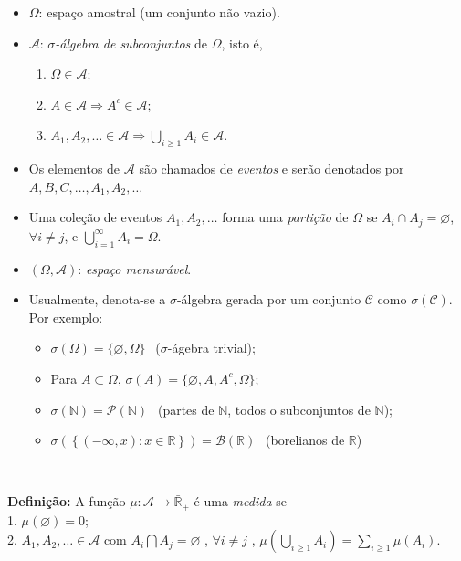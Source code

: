 \documentclass[
]{book}
\providecommand{\tightlist}{%
  \setlength{\itemsep}{0pt}\setlength{\parskip}{0pt}}
\begin{document}
\begin{itemize}
\item
  \(\Omega\): espaço amostral (um conjunto não vazio).
\item
  \(\mathcal{A}\): \emph{\(\sigma\)-álgebra de subconjuntos} de \(\Omega\), isto é,

  \begin{enumerate}
  \def\labelenumi{\arabic{enumi}.}
  \tightlist
  \item
    \(\Omega \in \mathcal{A}\);
  \item
    \(A \in \mathcal{A} \Longrightarrow A^{c} \in \mathcal{A}\);
  \item
    \(\displaystyle A_1, A_2, \ldots \in \mathcal{A} \Longrightarrow \bigcup_{i\geq1} A_i \in \mathcal{A}\).
  \end{enumerate}
\item
  Os elementos de \(\mathcal{A}\) são chamados de \emph{eventos} e serão denotados por \(A, B, C, \ldots, A_1, A_2, \ldots\)
\item
  Uma coleção de eventos \(A_1,A_2,\ldots\) forma uma \emph{partição} de \(\Omega\) se \(A_i \cap A_j = \varnothing\), \(\forall i \neq j\), e \(\displaystyle \bigcup_{i=1}^{\infty} A_i = \Omega\).
\item
  \((\Omega, \mathcal{A})\): \emph{espaço mensurável}.
\item
  Usualmente, denota-se a \(\sigma\)-álgebra gerada por um conjunto \(\mathcal{C}\) como \(\sigma(\mathcal{C})\). Por exemplo:

  \begin{itemize}
  \tightlist
  \item
    \(\sigma(\Omega) = \{\varnothing,\Omega\}~~\) (\(\sigma\)-ágebra trivial);
  \item
    Para \(A \subset \Omega\), \(\sigma(A) = \{\varnothing, A, A^c, \Omega\}\);
  \item
    \(\sigma(\mathbb{N}) = \mathcal{P}(\mathbb{N})~~\) (partes de \(\mathbb{N}\), todos o subconjuntos de \(\mathbb{N}\));
  \item
    \(\sigma\left(\left\{(-\infty,x): x \in \mathbb{R}\right\}\right) = \mathcal{B}\left(\mathbb{R}\right)~~\) (borelianos de \(\mathbb{R}\))
  \end{itemize}
\end{itemize}

\(~\)

\textbf{Definição:} A função \(\mu: \mathcal{A} \longrightarrow \bar{\mathbb{R}}_+\) é uma \emph{medida} se\\
1. \(\mu(\varnothing) = 0\);\\
2. \(\displaystyle A_1, A_2, \ldots \in \mathcal{A}\) com \(A_i \bigcap A_j = \varnothing\) , \(\forall i \neq j\) , \(\displaystyle \mu\left(\bigcup_{i \geq 1} A_i\right) = \sum_{i \geq 1} \mu\left(A_i\right)\).
\end{document}
